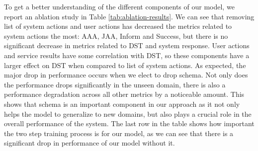 To get a better understanding of the different components of our model, we report an ablation study in Table \ref{tab:ablation-results}.
We can see that removing list of system actions and user actions has decreased the metrics related to system actions the most: AAA, JAA, Inform and Success,
but there is no significant decrease in metrics related to DST and system response. User actions and service results have some correlation with DST,
so these components have a larger effect on DST when compared to list of system actions. As expected, the major drop in performance occurs when we
elect to drop schema. Not only does the performance drops significantly in the unseen domain, there is also a performance degradation
across all other metrics by a noticeable amount. This shows that schema is an important component in our approach as
it not only helps the model to generalize to new domains, but also plays a crucial role in the overall performance of the system.
The last row in the table shows how important the two step training process is for our model, as we can see that there is a significant
drop in performance of our model without it.


